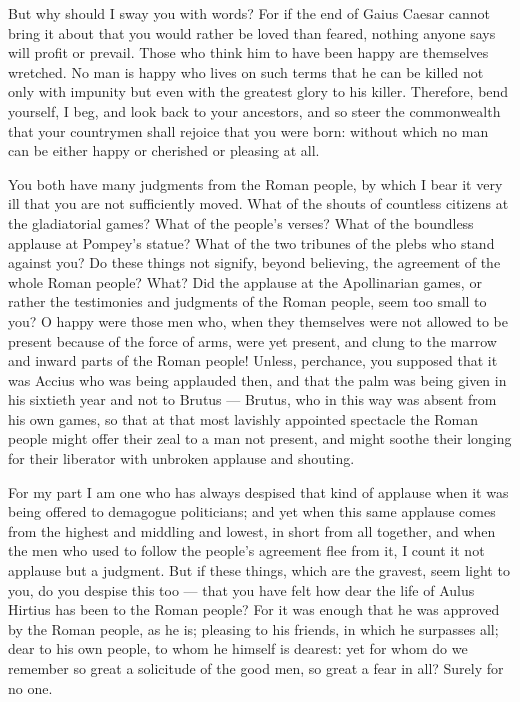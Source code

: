  But why should I sway you with words? For if the end of Gaius Caesar cannot bring it about that you would rather be loved than feared, nothing anyone says will profit or prevail. Those who think him to have been happy are themselves wretched. No man is happy who lives on such terms that he can be killed not only with impunity but even with the greatest glory to his killer. Therefore, bend yourself, I beg, and look back to your ancestors, and so steer the commonwealth that your countrymen shall rejoice that you were born: without which no man can be either happy or cherished or pleasing at all.

 You both have many judgments from the Roman people, by which I bear it very ill that you are not sufficiently moved. What of the shouts of countless citizens at the gladiatorial games? What of the people's verses? What of the boundless applause at Pompey's statue? What of the two tribunes of the plebs who stand against you? Do these things not signify, beyond believing, the agreement of the whole Roman people? What? Did the applause at the Apollinarian games, or rather the testimonies and judgments of the Roman people, seem too small to you? O happy were those men who, when they themselves were not allowed to be present because of the force of arms, were yet present, and clung to the marrow and inward parts of the Roman people! Unless, perchance, you supposed that it was Accius who was being applauded then, and that the palm was being given in his sixtieth year and not to Brutus --- Brutus, who in this way was absent from his own games, so that at that most lavishly appointed spectacle the Roman people might offer their zeal to a man not present, and might soothe their longing for their liberator with unbroken applause and shouting.

 For my part I am one who has always despised that kind of applause when it was being offered to demagogue politicians; and yet when this same applause comes from the highest and middling and lowest, in short from all together, and when the men who used to follow the people's agreement flee from it, I count it not applause but a judgment. But if these things, which are the gravest, seem light to you, do you despise this too --- that you have felt how dear the life of Aulus Hirtius has been to the Roman people? For it was enough that he was approved by the Roman people, as he is; pleasing to his friends, in which he surpasses all; dear to his own people, to whom he himself is dearest: yet for whom do we remember so great a solicitude of the good men, so great a fear in all? Surely for no one.

